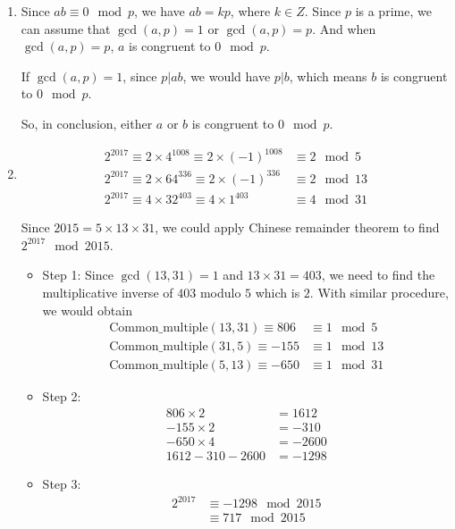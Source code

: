 \documentclass[11pt,a4paper]{article}
\begin{document}
\begin{enumerate}
	\item Since $ab \equiv 0 \mod p$, we have $ab = kp$, where $k \in Z$. Since $p$ is a prime, we can assume that $\gcd(a, p) = 1$ or $\gcd(a, p) = p$. And when $\gcd(a, p) = p$, $a$ is congruent to $0 \mod p$.
	\par If $\gcd(a, p) = 1$, since $p \vert ab$, we would have $p \vert b$, which means $b$ is congruent to $0 \mod p$.
	\par So, in conclusion, either $a$ or $b$ is congruent to $0 \mod p$.
	
	\item 
		\begin{align*}
			2^{2017} \equiv 2 \times 4^{1008} \equiv 2 \times (-1)^{1008} &\equiv 2 \mod 5 \\
			2^{2017} \equiv 2 \times 64^{336} \equiv 2 \times (-1)^{336} &\equiv 2 \mod 13 \\
			2^{2017} \equiv 4 \times 32^{403} \equiv 4 \times 1^{403} &\equiv 4 \mod 31
		\end{align*}
	\par Since $2015 = 5 \times 13 \times 31$, we could apply Chinese remainder theorem to find $2^{2017} \mod 2015$.
		\begin{itemize}
			\item Step 1: Since $\gcd(13, 31) = 1$ and $13 \times 31 = 403$, we need to find the multiplicative inverse of $403$ modulo $5$ which is $2$. With similar procedure, we would obtain
				\begin{align*}
					\mbox{Common\_multiple}(13, 31) \equiv 806 &\equiv 1 \mod 5 \\
					\mbox{Common\_multiple}(31, 5) \equiv -155 &\equiv 1 \mod 13 \\
					\mbox{Common\_multiple}(5, 13) \equiv -650 &\equiv 1 \mod 31
				\end{align*}
			\item Step 2:
				\begin{align*}
					806 \times 2 &= 1612 \\
					-155 \times 2 &= -310 \\
					-650 \times 4 &= -2600 \\					
					1612 -310 -2600 &= -1298
				\end{align*}
				
			\item Step 3:
				\begin{align*}
					2^{2017} &\equiv -1298 \mod 2015 \\
					&\equiv 717 \mod 2015
				\end{align*}
		\end{itemize}
	
\end{enumerate}
\end{document}
